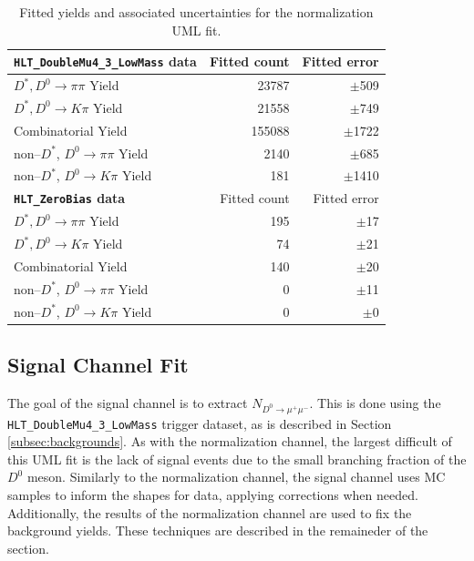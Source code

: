 \begin{table}[h!]
    \centering
    \begin{tabular}{@{}lrr@{}}
    \toprule
    \toprule
    \textbf{\texttt{HLT\_DoubleMu4\_3\_LowMass} data}& Fitted count & Fitted error  \\
    \midrule
    $D^*, D^0 \to \pi\pi$ Yield        & 23787 & $\pm$509 \\
    $D^*, D^0 \to K\pi$ Yield          & 21558  & $\pm$749 \\
    Combinatorial Yield               & 155088 & $\pm$1722 \\
    non--$D^*$, $D^0 \to \pi\pi$ Yield & 2140   & $\pm$685 \\
    non--$D^*$, $D^0 \to K\pi$ Yield   & 181     & $\pm$1410 \\
    \bottomrule
    \toprule
    \textbf{\texttt{HLT\_ZeroBias} data} & Fitted count & Fitted error \\
    \midrule
    $D^*, D^0 \to \pi\pi$ Yield        & 195 & $\pm$17 \\
    $D^*, D^0 \to K\pi$ Yield          & 74  & $\pm$21 \\
    Combinatorial Yield               & 140 & $\pm$20 \\
    non--$D^*$, $D^0 \to \pi\pi$ Yield & 0   & $\pm$11 \\
    non--$D^*$, $D^0 \to K\pi$ Yield   & 0     & $\pm$0 \\
    \bottomrule
    \bottomrule
    \end{tabular}
    \caption{Fitted yields and associated uncertainties for the normalization UML fit.}
    \label{tab:d0pipi_uml_fit_results}
    \end{table}

\subsection{Signal Channel Fit}
\label{subsec:signal_channel_uml}

The goal of the signal channel is to extract $N_{D^0 \to \mu^+ \mu^-}$. This is done using the \linebreak[4]\texttt{HLT\_DoubleMu4\_3\_LowMass}
trigger dataset, as is described in Section \ref{subsec:backgrounds}. As with the normalization channel, the largest difficult of this UML fit is the lack of signal events due to the small branching fraction of the $D^0$ meson. Similarly to the normalization channel, the signal channel uses MC samples to inform the shapes for data, applying corrections when needed. Additionally, the results of the normalization channel are used to fix the background yields. These techniques are described in the remaineder of the section.

